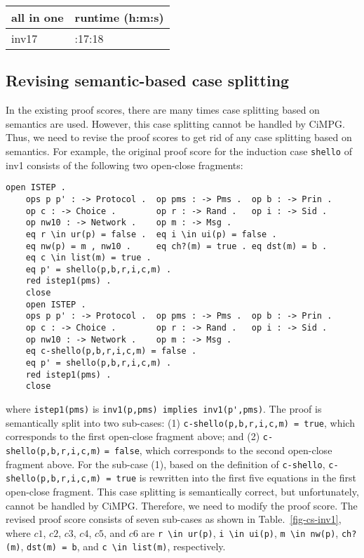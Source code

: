 \documentclass[a4paper,fleqn]{cas-dc}
\begin{document}
\begin{table}[]
\begin{tabularx}{0.48\textwidth} { 
  | >{\centering\arraybackslash}X 
  | >{\centering\arraybackslash}X|
 }
 \hline
 all in one & runtime (h:m:s) \\
 \hline
 inv17 & 52:17:18 \\
 \hline
\end{tabularx}
\end{table}


\subsection{Revising semantic-based case splitting}
In the existing proof scores, there are many times case splitting based on semantics are used. However, this case splitting cannot be handled by CiMPG. Thus, we need to revise the proof scores to get rid of any case splitting based on semantics. For example, the original proof score for the induction case  \verb!shello!  of inv1 consists of the following two open-close fragments:

\begin{small}
\begin{verbatim}
open ISTEP .
	ops p p' : -> Protocol .  op pms : -> Pms .  op b : -> Prin .
	op c : -> Choice .        op r : -> Rand .   op i : -> Sid . 
	op nw10 : -> Network .    op m : -> Msg .           
	eq r \in ur(p) = false .  eq i \in ui(p) = false .
	eq nw(p) = m , nw10 .     eq ch?(m) = true . eq dst(m) = b .
	eq c \in list(m) = true . 
	eq p' = shello(p,b,r,i,c,m) .
	red istep1(pms) .
	close
	open ISTEP .
	ops p p' : -> Protocol .  op pms : -> Pms .  op b : -> Prin .
	op c : -> Choice .        op r : -> Rand .   op i : -> Sid . 
	op nw10 : -> Network .    op m : -> Msg .           
	eq c-shello(p,b,r,i,c,m) = false . 
	eq p' = shello(p,b,r,i,c,m) .
	red istep1(pms) .
	close
\end{verbatim}
\end{small}

\noindent
where \verb!istep1(pms)! is \verb!inv1(p,pms) implies inv1(p',pms)!.
The proof is semantically split into two sub-cases: (1)  \verb!c-shello(p,b,r,i,c,m) = true!, which corresponds to the first open-close fragment above; 
and (2) \verb!c-shello(p,b,r,i,c,m)! \verb!= false!,
which corresponds to the second open-close fragment above. 
For the sub-case (1), based on the definition of \verb!c-shello!,  \verb!c-shello(p,b,r,i,c,m) = true! is rewritten into the first five equations in the first open-close fragment. 
This case splitting is semantically correct, but unfortunately, cannot be handled by CiMPG. Therefore, we need to modify the proof score. The revised proof score consists of seven sub-cases as shown in Table.~\ref{fig-cs-inv1}, where $c1$, $c2$, $c3$, $c4$, $c5$, and $c6$ are
 \verb!r \in ur(p)!,
 \verb!i \in ui(p)!,
 \verb!m \in nw(p)!,
 \verb!ch?(m)!,
 \verb!dst(m) = b!, and
 \verb!c \in list(m)!, respectively.
\end{document}
